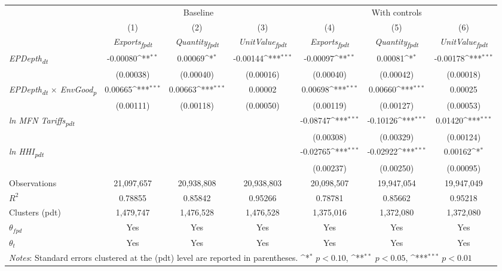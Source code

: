 {
\def\sym#1{\ifmmode^{#1}\else\(^{#1}\)\fi}
\begin{tabular}{l*{6}{c}}
\toprule
&\multicolumn{3}{c}{Baseline}&\multicolumn{3}{c}{With controls}\\\cmidrule(lr){2-4}\cmidrule(lr){5-7}
&(1)&(2)&(3)&(4)&(5)&(6)\\
&\textit{Exports\textsubscript{fpdt}}&\textit{Quantity\textsubscript{fpdt}}&\textit{UnitValue\textsubscript{fpdt}}&\textit{Exports\textsubscript{fpdt}}&\textit{Quantity\textsubscript{fpdt}}&\textit{UnitValue\textsubscript{fpdt}}\\
\midrule
\textit{EPDepth\textsubscript{dt}} & -0.00080\sym{**} & 0.00069\sym{*} & -0.00144\sym{***} & -0.00097\sym{**} & 0.00081\sym{*} & -0.00178\sym{***}\\
 & (0.00038) & (0.00040) & (0.00016) & (0.00040) & (0.00042) & (0.00018)\\
\addlinespace
\textit{EPDepth\textsubscript{dt} $\times$ EnvGood\textsubscript{p}} & 0.00665\sym{***} & 0.00663\sym{***} & 0.00002 & 0.00698\sym{***} & 0.00660\sym{***} & 0.00025\\
 & (0.00111) & (0.00118) & (0.00050) & (0.00119) & (0.00127) & (0.00053)\\
\addlinespace
\textit{ln MFN Tariffs\textsubscript{pdt}} &  &  &  & -0.08747\sym{***} & -0.10126\sym{***} & 0.01420\sym{***}\\
 &  &  &  & (0.00308) & (0.00329) & (0.00124)\\
\addlinespace
\textit{ln HHI\textsubscript{pdt}} &  &  &  & -0.02765\sym{***} & -0.02922\sym{***} & 0.00162\sym{*}\\
 &  &  &  & (0.00237) & (0.00250) & (0.00095)\\
\midrule
Observations & 21,097,657 & 20,938,808 & 20,938,803 & 20,098,507 & 19,947,054 & 19,947,049\\
$R^{2}$ & 0.78855 & 0.85842 & 0.95266 & 0.78781 & 0.85662 & 0.95218\\
Clusters (pdt) & 1,479,747 & 1,476,528 & 1,476,528 & 1,375,016 & 1,372,080 & 1,372,080\\
$\theta_{fpd}$ & Yes & Yes & Yes & Yes & Yes & Yes\\
$\theta_{t}$ & Yes & Yes & Yes & Yes & Yes & Yes\\
\bottomrule
\multicolumn{7}{l}{\footnotesize \textit{Notes}: Standard errors clustered at the (pdt) level are reported in parentheses. \sym{*} \(p<0.10\), \sym{**} \(p<0.05\), \sym{***} \(p<0.01\)}\\
\end{tabular}
}

